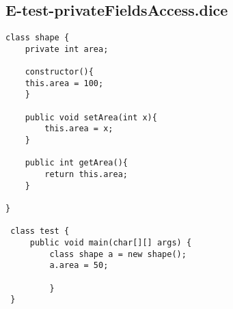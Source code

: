 \subsection{E-test-privateFieldsAccess.dice}
\begin{verbatim}
class shape {
	private int area;

	constructor(){
	this.area = 100;
	}

	public void setArea(int x){
		this.area = x;
	}

	public int getArea(){
		return this.area;
	}
	
}

 class test {
	 public void main(char[][] args) {
		 class shape a = new shape();
		 a.area = 50;
		 
		 }
 }
\end{verbatim}